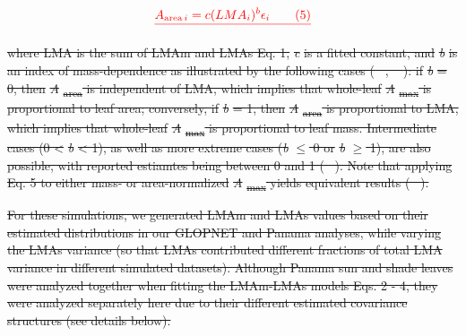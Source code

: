 \documentclass[
  12pt,
  letterpaper,
  DIV=11,
  numbers=noendperiod]{scrartcl}
\providecommand{\DIFdel}[1]{{\protect\color{red}\sout{#1}}}                      %
\begin{document}
\[
\DIFdel{A_{\mathrm{area} \, i} = c (LMA_i)^{b}\epsilon_i \qquad(5)
}\]%

\DIFdel{where LMA is the sum of LMAm and LMAs Eq. 1, }\emph{\DIFdel{c}} %
\DIFdel{is a fitted
constant, and }\emph{\DIFdel{b}} %
\DIFdel{is an index of mass-dependence as illustrated by
the following cases (\mbox{%
\citeproc{ref-Osnas2013}{Osnas et al. 2013}}\hspace{0pt}%
,
\mbox{%
\citeproc{ref-Osnas2018}{2018}}\hspace{0pt}%
): if }\emph{\DIFdel{b}} %
\DIFdel{= 0, then
}\emph{\DIFdel{A}}%
\DIFdel{\textsubscript{area} is independent of LMA, which implies that
whole-leaf }\emph{\DIFdel{A}}%
\DIFdel{\textsubscript{max} is proportional to leaf area;
conversely, if }\emph{\DIFdel{b}} %
\DIFdel{= 1, then }\emph{\DIFdel{A}}%
\DIFdel{\textsubscript{area} is
proportional to LMA, which implies that whole-leaf
}\emph{\DIFdel{A}}%
\DIFdel{\textsubscript{max} is proportional to leaf mass. Intermediate
cases (0 \textless{} }\emph{\DIFdel{b}} %
\DIFdel{\textless{} 1), as well as more extreme
cases (}\emph{\DIFdel{b}} %
\DIFdel{\(\le\) 0 or }\emph{\DIFdel{b}} %
\DIFdel{\(\geq\) 1), are also possible,
with reported estiamtes being between 0 and 1
(\mbox{%
\citeproc{ref-Osnas2018}{Osnas et al. 2018}}\hspace{0pt}%
). Note that applying Eq. 5
to either mass- or area-normalized }\emph{\DIFdel{A}}%
\DIFdel{\textsubscript{max} yields
equivalent results (\mbox{%
\citeproc{ref-Osnas2018}{Osnas et al. 2018}}\hspace{0pt}%
).
}%

\DIFdel{For these simulations, we generated LMAm and LMAs values based on their
estimated distributions in our GLOPNET and Panama analyses, while
varying the LMAs variance (so that LMAs contributed different fractions
of total LMA variance in different simulated datasets). Although Panama
sun and shade leaves were analyzed together when fitting the LMAm-LMAs
models Eqs. 2 - 4, they were analyzed separately here due to their
different estimated covariance structures (see details below).
}%
\end{document}
